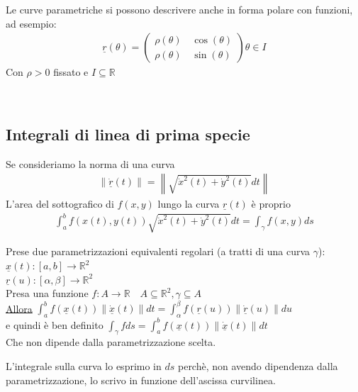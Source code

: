 \documentclass[a4paper, oneside]{article}
\begin{document}
\begin{proposition}
    Le curve parametriche si possono descrivere anche in forma polare con funzioni, ad esempio:
    \begin{gather*}
    \underline{r}(\theta) = \begin{pmatrix}
        \rho(\theta) \quad \cos(\theta)\\
        \rho(\theta) \quad \sin(\theta)
    \end{pmatrix}\theta \in I
    \end{gather*}
    Con $\rho > 0$ fissato e $I \subseteq \mathbb{R}$
\end{proposition}
\hfill\\


\subsection{Integrali di linea di prima specie}
Se consideriamo la norma di una curva
\begin{gather*}
     \left\lVert \underline{\dot{r}}(t) \right\rVert  =\left\lVert \sqrt{\dot{x}^2(t) + \dot{y}^2(t)} dt\right\rVert 
\end{gather*}
L'area del sottografico di $f(x,y)$ lungo la curva $\underline{r}(t)$ è proprio
\begin{gather*}
    \int_{a}^{b} f(x(t),y(t)) \sqrt{\dot{x}^2(t) + \dot{y}^2(t)} dt = \int_{\gamma} f(x,y) ds 
\end{gather*}


\begin{theorem}
    Prese due parametrizzazioni equivalenti regolari (a tratti di una curva $\gamma$):\\
    $\underline{x}(t):[a,b] \to \mathbb{R}^2$\\
    $\underline{r}(u):[\alpha,\beta] \to \mathbb{R}^2$\\
    Presa una funzione $f:A \to \mathbb{R} \quad A \subseteq \mathbb{R}^2, \gamma \subseteq A$\\
    \underline{Allora} $\int_{a}^{b} f(\underline{x}(t))\left\lVert \underline{\dot{x}} (t)\right\rVert dt = \int_{\alpha}^{\beta} f(\underline{r}(u)) \left\lVert \underline{\dot{r}}(u) \right\rVert du$\\
    e quindi è ben definito $\int_{\gamma} f ds = \int_{a}^{b} f(\underline{x}(t)) \left\lVert \underline{\dot{x}}(t)\right\rVert dt$\\
    Che non dipende dalla parametrizzazione scelta. 
\end{theorem}
\begin{aside}
    L'integrale sulla curva lo esprimo in $ds$ perchè, non avendo dipendenza dalla parametrizzazione, lo scrivo in funzione dell'ascissa curvilinea.
\end{aside}
\end{document}
